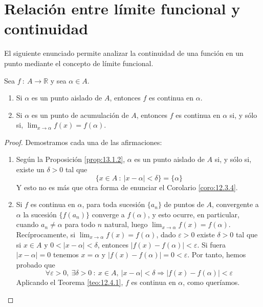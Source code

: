 
\section{Relación entre límite funcional y continuidad}

El siguiente enunciado permite analizar la continuidad de una función en un punto mediante el concepto de límite funcional.

\begin{prop}\label{prop:13.2.1}
    Sea $f ~:~ A \longrightarrow \mathbb{R}$ y sea $\alpha \in A$.
    \begin{enumerate}
        \item Si $\alpha$ es un punto aislado de $A$, entonces $f$ es continua en $\alpha$.

        \item Si $\alpha$ es un punto de acumulación de $A$, entonces $f$ es continua en $\alpha$ si, y sólo si,
        $\displaystyle\lim_{x \to \alpha} f(x) = f(\alpha)$.
    \end{enumerate}
\end{prop}
\begin{proof} Demostramos cada una de las afirmaciones:
    \begin{enumerate}
        \item Según la Proposición \ref{prop:13.1.2}, $\alpha$ es un punto aislado de $A$ si, y sólo si, existe un $\delta > 0$ tal que
        \begin{equation*}
            \{x \in A ~:~ |x-\alpha| < \delta\} = \{\alpha\}
        \end{equation*}
        Y esto no es más que otra forma de enunciar el Corolario \ref{coro:12.3.4}.

        \item Si $f$ es continua en $\alpha$, para toda sucesión $\{a_n\}$ de puntos de $A$, convergente a $\alpha$ la sucesión $\{f(a_n)\}$ converge a $f(\alpha)$, y esto ocurre, en particular, cuando $a_n \neq \alpha$ para todo $n$ natural, luego $\displaystyle\lim_{x \to \alpha} f(x) = f(\alpha)$.\\
        
        Recíprocamente, si $\displaystyle\lim_{x \to \alpha} f(x) = f(\alpha)$, dado $\varepsilon > 0$ existe $\delta > 0$ tal que si $x \in A$ y $0 < |x-\alpha| < \delta$, entonces $|f(x)-f(\alpha)| < \varepsilon$.
        Si fuera $|x-\alpha|=0$ tenemos $x = \alpha$ y $|f(x)-f(\alpha)| = 0 < \varepsilon$. Por tanto, hemos probado que
        \begin{equation*}
            \forall \varepsilon > 0, ~ \exists \delta > 0 ~:~ x \in A, ~ |x-\alpha| < \delta \Longrightarrow |f(x)-f(\alpha)| < \varepsilon
        \end{equation*}
        Aplicando el Teorema \ref{teo:12.4.1}, $f$ es continua en $\alpha$, como queríamos.
    \end{enumerate}
\end{proof}

